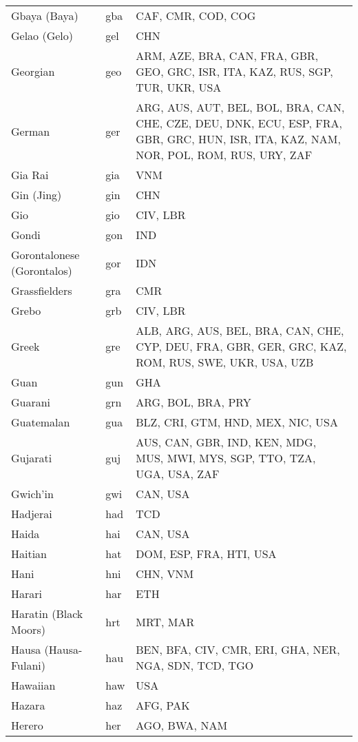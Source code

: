 \documentclass[12pt]{article}
\begin{document}
\begin{center}
\begin{longtable}{|p{7cm}|p{1cm}|p{7cm}|}
Gbaya (Baya)	&	gba 	&	CAF, CMR, COD, COG	\\	\cline{1-3}
Gelao (Gelo)	&	gel	&	CHN	\\	\cline{1-3}
Georgian	&	geo	&	ARM, AZE, BRA, CAN, FRA, GBR, GEO, GRC, ISR, ITA, KAZ, RUS, SGP, TUR, UKR, USA	\\	\cline{1-3}
German	&	ger	&	ARG, AUS, AUT, BEL, BOL, BRA, CAN, CHE, CZE, DEU, DNK, ECU, ESP, FRA, GBR, GRC, HUN, ISR, ITA, KAZ, NAM, NOR, POL, ROM, RUS, URY, ZAF	\\	\cline{1-3}
Gia Rai	&	gia	&	VNM	\\	\cline{1-3}
Gin (Jing)	&	gin	&	CHN	\\	\cline{1-3}
Gio	&	gio	&	CIV, LBR	\\	\cline{1-3}
Gondi	&	gon 	&	IND	\\	\cline{1-3}
Gorontalonese (Gorontalos)	&	gor 	&	IDN	\\	\cline{1-3}
Grassfielders 	&	gra	&	CMR	\\	\cline{1-3}
Grebo	&	grb 	&	CIV, LBR	\\	\cline{1-3}
Greek	&	gre	&	ALB, ARG, AUS, BEL, BRA, CAN, CHE, CYP, DEU, FRA, GBR, GER, GRC, KAZ, ROM, RUS, SWE, UKR, USA, UZB	 \\	\cline{1-3}
Guan	&	gun	&	GHA	\\	\cline{1-3}
Guarani	&	grn 	&	ARG, BOL, BRA, PRY	\\	\cline{1-3}
Guatemalan	&	gua	&	BLZ, CRI, GTM, HND, MEX, NIC, USA	\\	\cline{1-3}
Gujarati	&	guj 	&	AUS, CAN, GBR, IND, KEN, MDG, MUS, MWI, MYS, SGP, TTO, TZA, UGA, USA, ZAF	\\	\cline{1-3}
Gwich'in	&	gwi 	&	CAN, USA	\\	\cline{1-3}
Hadjerai	&	had	&	TCD	\\	\cline{1-3}
Haida	&	hai 	&	CAN, USA	\\	\cline{1-3}
Haitian	&	hat 	&	DOM,  ESP, FRA, HTI, USA	\\	\cline{1-3}
Hani	&	hni	&	CHN, VNM	\\	\cline{1-3}
Harari	&	har	&	ETH	\\	\cline{1-3}
Haratin (Black Moors)	&	hrt	&	MRT, MAR	\\	\cline{1-3}
Hausa (Hausa-Fulani)	&	hau 	&	BEN, BFA, CIV, CMR, ERI, GHA, NER, NGA, SDN, TCD, TGO	\\	\cline{1-3}
Hawaiian	&	haw 	&	USA	\\	\cline{1-3}
Hazara	&	haz	&	AFG, PAK	\\	\cline{1-3}
Herero	&	her 	&	AGO, BWA, NAM	\\	\cline{1-3}

\end{longtable}
\end{center}
\end{document}
